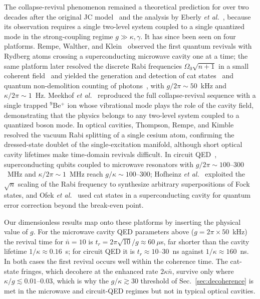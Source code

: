 \documentclass{iopjournal}
\begin{document}
The collapse-revival phenomenon remained a theoretical prediction for over two decades after the original JC model~\cite{jaynes1963} and the analysis by Eberly \textit{et al.}~\cite{eberly1980}, because its observation requires a single two-level system coupled to a single quantized mode in the strong-coupling regime $g \gg \kappa, \gamma$. It has since been seen on four platforms. Rempe, Walther, and Klein~\cite{rempe1987} observed the first quantum revivals with Rydberg atoms crossing a superconducting microwave cavity one at a time; the same platform later resolved the discrete Rabi frequencies $\Omega_0\sqrt{n+1}$ in a small coherent field~\cite{brune1996rabi} and yielded the generation and detection of cat states~\cite{brune1996} and quantum non-demolition counting of photons~\cite{haroche2006}, with $g/2\pi \sim 50$~kHz and $\kappa/2\pi \sim 1$~Hz. Meekhof \textit{et al.}~\cite{meekhof1996} reproduced the full collapse-revival sequence with a single trapped $^9$Be$^+$ ion whose vibrational mode plays the role of the cavity field, demonstrating that the physics belongs to any two-level system coupled to a quantized boson mode. In optical cavities, Thompson, Rempe, and Kimble~\cite{thompson1992} resolved the vacuum Rabi splitting of a single cesium atom, confirming the dressed-state doublet of the single-excitation manifold, although short optical cavity lifetimes make time-domain revivals difficult. In circuit QED~\cite{blais2021}, superconducting qubits coupled to microwave resonators with $g/2\pi \sim 100$--$300$~MHz and $\kappa/2\pi \sim 1$~MHz reach $g/\kappa \sim 100$--$300$; Hofheinz \textit{et al.}~\cite{hofheinz2009} exploited the $\sqrt{n}$ scaling of the Rabi frequency to synthesize arbitrary superpositions of Fock states, and Ofek \textit{et al.}~\cite{ofek2016} used cat states in a superconducting cavity for quantum error correction beyond the break-even point.

Our dimensionless results map onto these platforms by inserting the physical value of $g$. For the microwave cavity QED parameters above ($g = 2\pi \times 50$~kHz) the revival time for $\bar{n} = 10$ is $t_r = 2\pi\sqrt{10}/g \approx 60~\mu$s, far shorter than the cavity lifetime $1/\kappa \approx 0.16$~s; for circuit QED it is $t_r \approx 10$--$30$~ns against $1/\kappa \approx 160$~ns. In both cases the first revival occurs well within the coherence time. The cat-state fringes, which decohere at the enhanced rate $2\kappa\bar{n}$, survive only where $\kappa/g \lesssim 0.01$--$0.03$, which is why the $g/\kappa \gtrsim 30$ threshold of Sec.~\ref{sec:decoherence} is met in the microwave and circuit-QED regimes but not in typical optical cavities.
\end{document}
